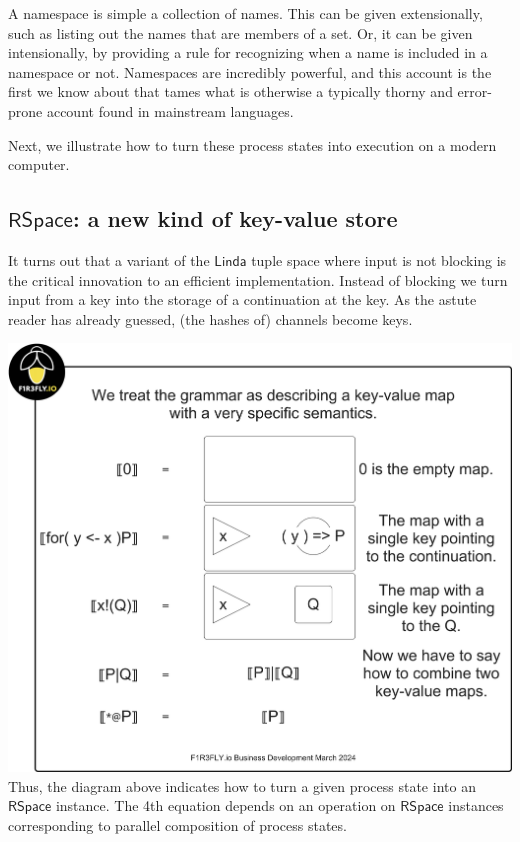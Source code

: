 \begin{remark}
  A namespace is simple a collection of names. This can be given
  extensionally, such as listing out the names that are members of a
  set. Or, it can be given intensionally, by providing a rule for
  recognizing when a name is included in a namespace or
  not. Namespaces are incredibly powerful, and this account is the
  first we know about that tames what is otherwise a typically thorny
  and error-prone account found in mainstream languages.
\end{remark}

Next, we illustrate how to turn these process states into execution on
a modern computer.

\subsection{$\mathsf{RSpace}$: a new kind of key-value store}

It turns out that a variant of the $\mathsf{Linda}$ tuple space
\cite{DBLP:conf/parle/Gelernter89} where input is not blocking is the
critical innovation to an efficient implementation. Instead of
blocking we turn input from a key into the storage of a continuation
at the key. As the astute reader has already guessed, (the hashes of)
channels become keys.

\includegraphics[scale=0.25]{RHO20RSpaceSlide1.pdf} \\

Thus, the diagram above indicates how to turn a given process state
into an $\mathsf{RSpace}$ instance. The 4th equation depends on an
operation on $\mathsf{RSpace}$ instances corresponding to parallel
composition of process states. 

